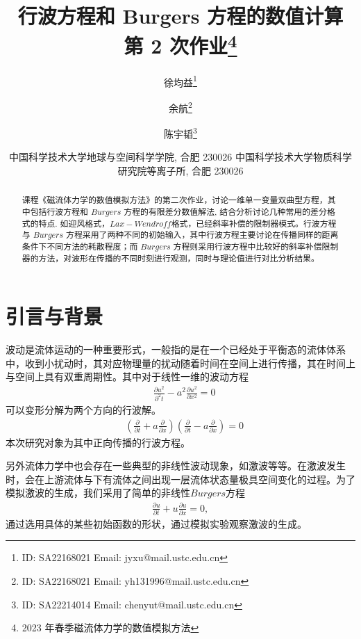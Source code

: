 \documentclass[10.5pt
]{article}
\def\Term{2023 年春季}
\def\Course{磁流体力学的数值模拟方法}
\begin{document}
\title{行波方程和 Burgers 方程的数值计算 \\
  第 2 次作业\footnote{\Term\Course}}

\author{徐均益\footnote{ID: SA22168021 Email: jyxu@mail.ustc.edu.cn}
  \and
  余航\footnote{ID: SA22168021 Email: yh131996@mail.ustc.edu.cn}
  \and
  陈宇韬\footnote{ID: SA22214014 Email: chenyut@mail.ustc.edu.cn}
}

\date{%
\scriptsize%
中国科学技术大学地球与空间科学学院, 合肥 230026
中国科学技术大学物质科学研究院等离子所, 合肥 230026
%
}


\maketitle

\begin{abstract}
课程《磁流体力学的数值模拟方法》的第二次作业，讨论一维单一变量双曲型方程，其中包括行波方程和 $Burgers$ 方程的有限差分数值解法,
结合分析讨论几种常用的差分格式的特点. 如迎风格式，$Lax-Wendroff$格式，已经斜率补偿的限制器模式。行波方程与 $Burgers$ 方程采用了两种不同的初始输入，其中行波方程主要讨论在传播同样的距离条件下不同方法的耗散程度；而 $Burgers$ 方程则采用行波方程中比较好的斜率补偿限制器的方法，对波形在传播的不同时刻进行观测，同时与理论值进行对比分析结果。
\end{abstract}

\section{引言与背景}
波动是流体运动的一种重要形式，一般指的是在一个已经处于平衡态的流体体系中，收到小扰动时，其对应物理量的扰动随着时间在空间上进行传播，其在时间上与空间上具有双重周期性。其中对于线性一维的波动方程
\begin{align}
& \frac{\partial u^2}{\partial^2 t} - a^2 \frac{\partial u^2}{\partial x^2} = 0
\label{EqnCon}
\end{align}
可以变形分解为两个方向的行波解。
\begin{align}
    & \left( \frac{\partial }{\partial t} + a \frac{\partial }{\partial x} \right) \left( \frac{\partial }{\partial t} - a \frac{\partial }{\partial x} \right)= 0
\label{EqnCon}
\end{align}
本次研究对象为其中正向传播的行波方程。

另外流体力学中也会存在一些典型的非线性波动现象，如激波等等。在激波发生时，会在上游流体与下有流体之间出现一层流体状态量极具空间变化的过程。为了模拟激波的生成，我们采用了简单的非线性$Burgers$方程
\begin{align}
\frac{\partial u}{\partial t} + u \frac{\partial u}{\partial x} = 0, \label{EqnBurgers}
\end{align}
通过选用具体的某些初始函数的形状，通过模拟实验观察激波的生成。
\end{document}
